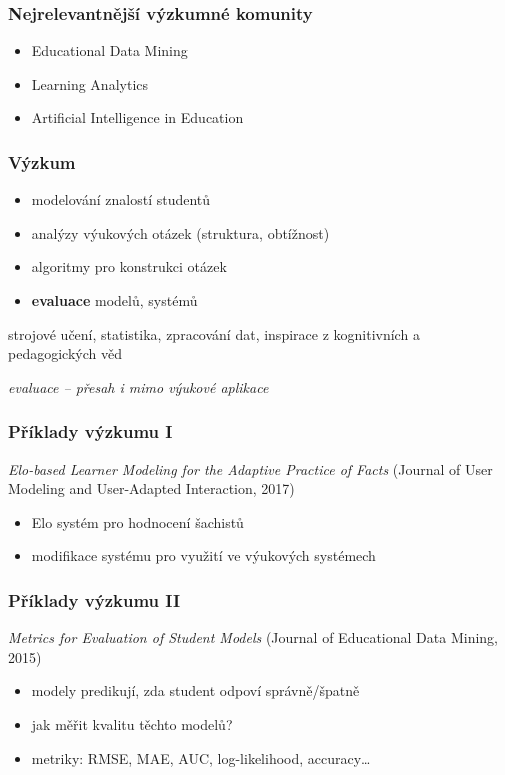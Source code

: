 \documentclass[bigger]{beamer}
\begin{document}
\begin{frame}
  \frametitle{Nejrelevantnější výzkumné komunity}

  \begin{itemize}
  \item Educational Data Mining
  \item Learning Analytics
  \item Artificial Intelligence in Education
  \end{itemize}
\end{frame}

\begin{frame}
  \frametitle{Výzkum}

  \begin{itemize}
  \item modelování znalostí studentů
  \item analýzy výukových otázek (struktura, obtížnost)
  \item algoritmy pro konstrukci otázek
  \item \textbf{evaluace} modelů, systémů
  \end{itemize}

  \bigskip

  strojové učení, statistika, zpracování dat, inspirace z kognitivních a
  pedagogických věd

  \bigskip

  \emph{evaluace -- přesah i mimo výukové aplikace}
\end{frame}

\begin{frame}
  \frametitle{Příklady výzkumu I}

  \emph{Elo-based Learner Modeling for the Adaptive Practice of Facts} (Journal
  of User Modeling and User-Adapted Interaction, 2017) 

  \bigskip

  \begin{itemize}
  \item Elo systém pro hodnocení šachistů
  \item modifikace systému pro využití ve výukových systémech
  \end{itemize}
\end{frame}


\begin{frame}
  \frametitle{Příklady výzkumu II}

  \emph{Metrics for Evaluation of Student Models} (Journal of Educational Data
  Mining, 2015)

  \bigskip

  \begin{itemize}
  \item modely predikují, zda student odpoví správně/špatně
  \item jak měřit kvalitu těchto modelů?
  \item metriky: RMSE, MAE, AUC, log-likelihood, accuracy\ldots
  \end{itemize}
\end{frame}
\end{document}
